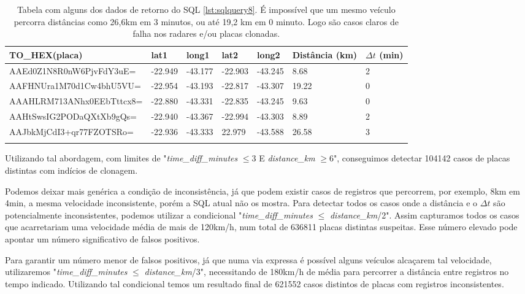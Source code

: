 \documentclass{article}
\begin{document}
\begin{longtable}{|l|l|l|l|l|l|l|}
\hline
TO\_HEX(placa)  & lat1 & long1 & lat2 & long2 & Distância (km) & $\Delta t$ (min)  \\ \hline
AAEd0Z1N8R0nW6PjvFdY3uE= & -22.949    & -43.177    & -22.903 & -43.245 & 8.68  & 2         \\ \hline
AAFHNUra1M70d1Cw4bhU5VU= & -22.954 & -43.193   & -22.817 & -43.307    & 19.22 & 0    \\ \hline
AAAHLRM713ANhx0EEbTttcx8= & -22.880 & -43.331   & -22.835 & -43.245  & 9.63 & 0    \\ \hline
AAHtSwsIG2PODaQXtXb9gQs= & -22.940 & -43.367   & -22.994 & -43.303   & 8.89 & 2   \\ \hline
AAJbkMjCdI3+qr77FZOTSRo= & -22.936 & -43.333   & 22.979 & -43.588  & 26.58 & 3  \\ \hline
\caption{\label{tab:results1}  Tabela com alguns dos dados de retorno do SQL \ref{lst:sqlquery8}. É impossível que um mesmo veículo percorra distâncias como 26,6km em 3 minutos, ou até 19,2 km em 0 minuto. Logo são casos claros de falha nos radares e/ou placas clonadas.}
\end{longtable}

Utilizando tal abordagem, com limites de "\textit{time\_diff\_minutes} $\leq 3 $ E \textit{distance\_km} $ \geq 6$", conseguimos detectar 104142 casos de placas distintas com indícios de clonagem.

Podemos deixar mais genérica a condição de inconsistência, já que podem existir casos de registros que percorrem, por exemplo, 8km em 4min, a mesma velocidade inconsistente, porém a SQL atual não os mostra. Para detectar todos os casos onde a distância e o $\Delta t$ são potencialmente inconsistentes, podemos utilizar a condicional "\textit{time\_diff\_minutes} $\leq$ \textit{distance\_km}/2". Assim capturamos todos os casos que acarretariam uma velocidade média de mais de 120km/h, num total de 636811 placas distintas suspeitas. Esse número elevado pode apontar um número significativo de falsos positivos.

Para garantir um número menor de falsos positivos, já que numa via expressa é possível alguns veículos alcaçarem tal velocidade, utilizaremos "\textit{time\_diff\_minutes} $\leq$ \textit{distance\_km}/3", necessitando de 180km/h de média para percorrer a distância entre registros no tempo indicado. Utilizando tal condicional temos um resultado final de 621552 casos distintos de placas com registros inconsistentes.
\end{document}
